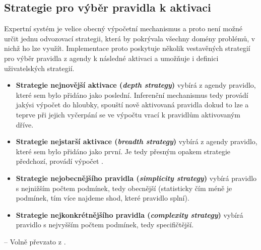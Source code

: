 \subsection{Strategie pro výběr pravidla k aktivaci}
Expertní systém je velice obecný výpočetní mechanismus a proto není možné
určit jednu odvozovací strategii, která by pokrývala všechny domény problémů,
v nichž ho lze využít. Implementace proto poskytuje několik vestavěných
strategií pro výběr pravidla z agendy k následné aktivaci a umožňuje i
definici uživatelských strategií.
\begin{itemize}
\item {\bf{}Strategie nejnovější aktivace (\emph{depth strategy})} vybírá z agendy
pravidlo, které sem bylo přidáno jako poslední. Inferenční mechanismus tedy
provádí jakýsi výpočet do hloubky, spouští nově aktivovaná pravidla dokud to
lze a teprve při jejich vyčerpání se ve výpočtu vrací k pravidlům aktivovaným
dříve.
\item {\bf{}Strategie nejstarší aktivace (\emph{breadth strategy})} vybírá z agendy
pravidlo, které sem bylo přidáno jako první. Je tedy přesným opakem strategie
předchozí, provádí výpočet .
\item {\bf{}Strategie nejobecnějšího pravidla (\emph{simplicity strategy})} vybírá
pravidlo s nejnižším počtem podmínek, tedy obecnější (statisticky čím méně je podmínek,
tím více najdeme shod, které pravidlo splní).
\item {\bf{}Strategie nejkonkrétnějšího pravidla (\emph{complexity strategy})} vybírá
pravidlo s nejvyšším počtem podmínek, tedy specifičtější.
\end{itemize}
-- Volně převzato z \cite{introduction}.
